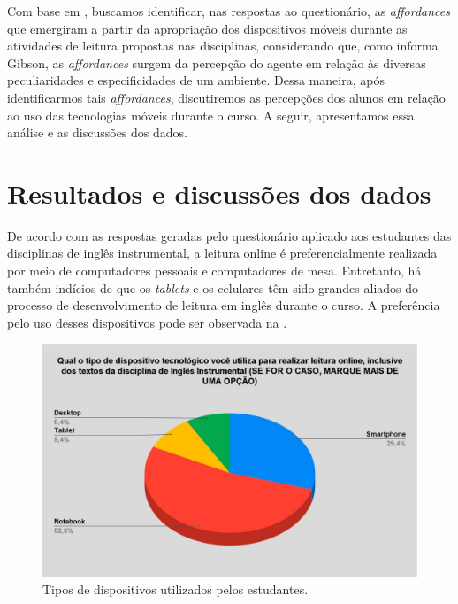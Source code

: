 \documentclass[portuguese]{textolivre}
\begin{document}
Com base em \textcite{gibson1977theory}, buscamos identificar, nas respostas ao questionário, as \emph{affordances} que emergiram a partir da apropriação dos dispositivos móveis durante as atividades de leitura propostas nas disciplinas, considerando que, como informa Gibson, as \emph{affordances} surgem da percepção do agente em relação às diversas peculiaridades e especificidades de um ambiente. Dessa maneira, após identificarmos tais \emph{affordances}, discutiremos as percepções dos alunos em relação ao uso das tecnologias móveis durante o curso. A seguir, apresentamos essa análise e as discussões dos dados. 



\section{Resultados e discussões dos dados}
De acordo com as respostas geradas pelo questionário aplicado aos estudantes das disciplinas de inglês instrumental, a leitura online é preferencialmente realizada por meio de computadores pessoais e computadores de mesa. Entretanto, há também indícios de que os \emph{tablets} e os celulares têm sido grandes aliados do processo de desenvolvimento de leitura em inglês durante o curso. A preferência pelo uso desses dispositivos pode ser observada na . 

\begin{figure}[h]
\centering
\begin{minipage}{.65\textwidth}
 \includegraphics[width=\textwidth]{figura2.jpg}
 \caption{Tipos de dispositivos utilizados pelos estudantes.}
 \label{fig02}
\end{minipage}
\end{figure}
\end{document}

